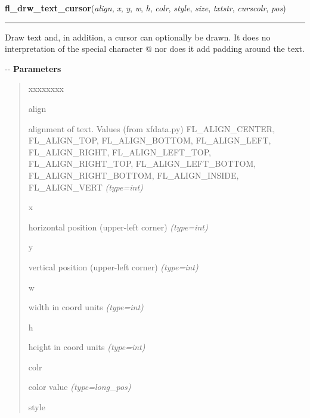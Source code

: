 \hspace{.8\funcindent}\begin{boxedminipage}{\funcwidth}

    \raggedright \textbf{fl\_drw\_text\_cursor}(\textit{align}, \textit{x}, \textit{y}, \textit{w}, \textit{h}, \textit{colr}, \textit{style}, \textit{size}, \textit{txtstr}, \textit{curscolr}, \textit{pos})

    \vspace{-1.5ex}

    \rule{\textwidth}{0.5\fboxrule}
\setlength{\parskip}{2ex}

Draw text and, in addition, a cursor can optionally be drawn. It does
no interpretation of the special character @ nor does it add padding
around the text.

-{}-
\setlength{\parskip}{1ex}
      \textbf{Parameters}
      \vspace{-1ex}

      \begin{quote}
        \begin{Ventry}{xxxxxxxx}

          \item[align]


alignment of text. Values (from xfdata.py) FL\_ALIGN\_CENTER,
FL\_ALIGN\_TOP, FL\_ALIGN\_BOTTOM, FL\_ALIGN\_LEFT, FL\_ALIGN\_RIGHT,
FL\_ALIGN\_LEFT\_TOP, FL\_ALIGN\_RIGHT\_TOP, FL\_ALIGN\_LEFT\_BOTTOM,
FL\_ALIGN\_RIGHT\_BOTTOM, FL\_ALIGN\_INSIDE, FL\_ALIGN\_VERT
            {\it (type=int)}

          \item[x]


horizontal position (upper-left corner)
            {\it (type=int)}

          \item[y]


vertical position (upper-left corner)
            {\it (type=int)}

          \item[w]


width in coord units
            {\it (type=int)}

          \item[h]


height in coord units
            {\it (type=int)}

          \item[colr]


color value
            {\it (type=long\_pos)}

          \item[style]



\end{Ventry}
\end{quote}
\end{boxedminipage}

